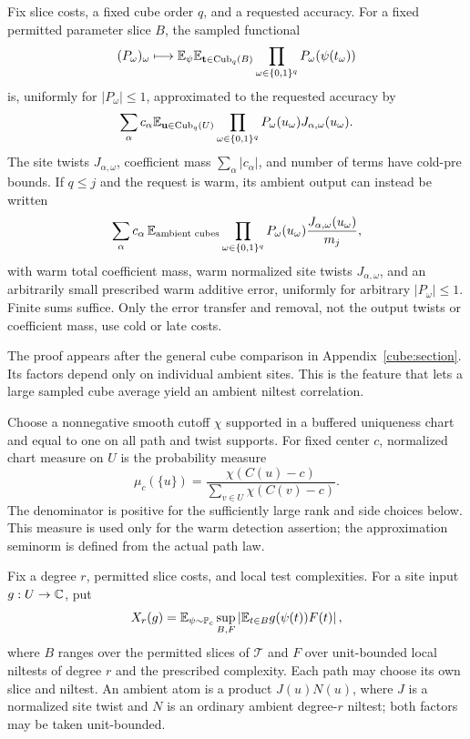 \begin{lemma}\label{ap:path:comparison}
Fix slice costs, a fixed cube order $q$, and a requested accuracy.
For a fixed permitted parameter slice $B$, the sampled functional
\[
 (P_\omega)_\omega\longmapsto
 \mathbb E_\psi\mathbb E_{\mathbf t\in\operatorname{Cub}_q(B)}
            \prod_{\omega\in\{0,1\}^q}P_\omega(\psi(t_\omega))
\]
is, uniformly for $|P_\omega|\le1$, approximated to the requested
accuracy by
\[
 \sum_\alpha c_\alpha
 \mathbb E_{\mathbf u\in\operatorname{Cub}_q(U)}
       \prod_{\omega\in\{0,1\}^q}
                P_\omega(u_\omega)J_{\alpha,\omega}(u_\omega).
\]
The site twists $J_{\alpha,\omega}$, coefficient mass
$\sum_\alpha|c_\alpha|$, and number of terms have cold-pre bounds.  If $q\le j$ and
the request is warm, its ambient output can instead be written
\begin{equation}\label{ap:path:sparse-comparison}
 \sum_\alpha c_\alpha\,
 \mathbb E_{\text{ambient cubes}}
       \prod_{\omega\in\{0,1\}^q}
       P_\omega(u_\omega)\frac{J_{\alpha,\omega}(u_\omega)}{m_j},
\end{equation}
with warm total coefficient mass, warm normalized site twists
$J_{\alpha,\omega}$, and an arbitrarily small prescribed warm
additive error, uniformly for arbitrary $|P_\omega|\le1$.
Finite sums suffice.  Only the error transfer and removal, not the
output twists or coefficient mass, use cold or late costs.
\end{lemma}


The proof appears after the general cube comparison in
Appendix~\ref{cube:section}. Its factors depend only on individual
ambient sites. This is the feature that lets a large sampled cube
average yield an ambient niltest correlation.

Choose a nonnegative smooth cutoff $\chi$ supported in a buffered
uniqueness chart and equal to one on all path and twist supports.
For fixed center $c$, normalized chart measure on $U$ is the
probability measure
\[
 \mu_c(\{u\})=
 \frac{\chi(C(u)-c)}{\sum_{v\in U}\chi(C(v)-c)}.
\]
The denominator is positive for the sufficiently large rank and
side choices below. This measure is used only for the warm
detection assertion; the approximation seminorm is defined from
the actual path law.

Fix a degree $r$, permitted slice costs, and local test complexities.
For a site input $g:U\to\mathbb C$, put
\[
 X_r(g)=\mathbb E_{\psi\sim\mathbb P_c}
        \sup_{B,F}\left|\mathbb E_{t\in B}g(\psi(t))F(t)\right|,
\]
where $B$ ranges over the permitted slices of $\mathcal T$ and $F$
over unit-bounded local niltests of degree $r$ and the prescribed
complexity. Each path may choose its own slice and niltest. An
ambient atom is a product $J(u)N(u)$, where $J$ is a normalized
site twist and $N$ is an ordinary ambient degree-$r$ niltest;
both factors may be taken unit-bounded.

